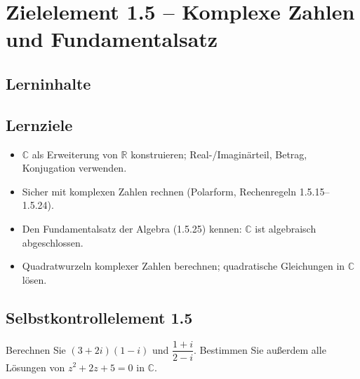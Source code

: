 \documentclass[a4paper,12pt]{article}
\begin{document}
\newpage

\section*{Zielelement 1.5 -- Komplexe Zahlen und Fundamentalsatz}

\subsection*{Lerninhalte}
\begin{center}
\end{center}

\subsection*{Lernziele}
\begin{itemize}
  \item $\mathbb{C}$ als Erweiterung von $\mathbb{R}$ konstruieren; Real-/Imaginärteil, Betrag, Konjugation verwenden.
  \item Sicher mit komplexen Zahlen rechnen (Polarform, Rechenregeln 1.5.15--1.5.24).
  \item Den Fundamentalsatz der Algebra (1.5.25) kennen: $\mathbb{C}$ ist algebraisch abgeschlossen.
  \item Quadratwurzeln komplexer Zahlen berechnen; quadratische Gleichungen in $\mathbb{C}$ lösen.
\end{itemize}

\subsection*{Selbstkontrollelement 1.5}
Berechnen Sie $(3 + 2i)(1 - i)$ und $\dfrac{1+i}{2-i}$. Bestimmen Sie außerdem
alle Lösungen von $z^2 + 2z + 5 = 0$ in $\mathbb{C}$.
\end{document}
